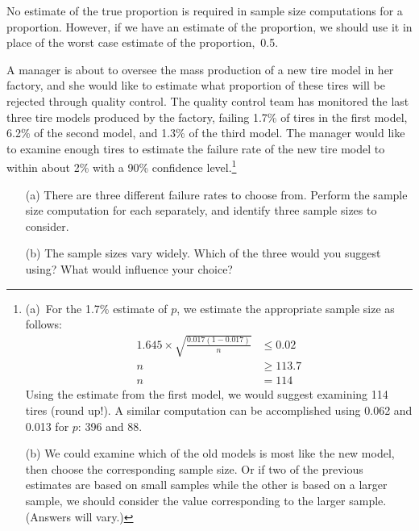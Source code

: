 No estimate of the true proportion is required in sample size computations for a proportion. However, if we have an estimate of the proportion, we should use it in place of the worst case estimate of the proportion,~0.5.

\begin{exercise}
A manager is about to oversee the mass production of a new tire model in her factory, and she would like to estimate what proportion of these tires will be rejected through quality control. The quality control team has monitored the last three tire models produced by the factory, failing 1.7\% of tires in the first model, 6.2\% of the second model, and 1.3\% of the third model. The manager would like to examine enough tires to estimate the failure rate of the new tire model to within about 2\% with a 90\% confidence level.\footnote{(a)~For the 1.7\% estimate of $p$, we estimate the appropriate sample size as follows:
\begin{align*}
1.645\times \sqrt{\frac{0.017(1-0.017)}{n}} &\leq 0.02 \\
n &\geq 113.7 \\
n&=114
\end{align*}
Using the estimate from the first model, we would suggest examining 114 tires (round up!). A similar computation can be accomplished using 0.062 and 0.013 for $p$: 396 and 88. \par
(b) We could examine which of the old models is most like the new model, then choose the corresponding sample size. Or if two of the previous estimates are based on small samples while the other is based on a larger sample, we should consider the value corresponding to the larger sample. (Answers will vary.)}
\begin{itemize}
\setlength{\itemsep}{0mm}
\item[(a)] There are three different failure rates to choose from. Perform the sample size computation for each separately, and identify three sample sizes to consider.
\item[(b)] The sample sizes vary widely. Which of the three would you suggest using? What would influence your choice?
\end{itemize}
\end{exercise}


